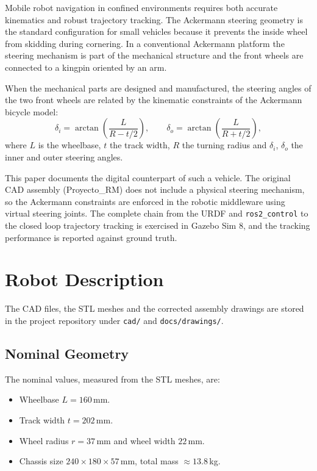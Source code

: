 \documentclass[conference]{IEEEtran}
\begin{document}
Mobile robot navigation in confined environments requires both accurate
kinematics and robust trajectory tracking. The Ackermann steering geometry is
the standard configuration for small vehicles because it prevents the inside
wheel from skidding during cornering. In a conventional Ackermann platform the
steering mechanism is part of the mechanical structure and the front wheels are
connected to a kingpin oriented by an arm.

When the mechanical parts are designed and manufactured, the steering angles of
the two front wheels are related by the kinematic constraints of the Ackermann
bicycle model:
\begin{equation}
  \delta_i = \arctan\left(\frac{L}{R - t/2}\right),
  \qquad
  \delta_o = \arctan\left(\frac{L}{R + t/2}\right),
  \label{eq:ackermann}
\end{equation}
where $L$ is the wheelbase, $t$ the track width, $R$ the turning radius and
$\delta_i$, $\delta_o$ the inner and outer steering angles.

This paper documents the digital counterpart of such a vehicle. The original
CAD assembly (Proyecto\_RM) does not include a physical steering mechanism, so
the Ackermann constraints are enforced in the robotic middleware using virtual
steering joints. The complete chain from the URDF and \texttt{ros2\_control} to
the closed loop trajectory tracking is exercised in Gazebo Sim 8, and the
tracking performance is reported against ground truth.

\section{Robot Description}
\label{sec:robot}

The CAD files, the STL meshes and the corrected assembly drawings are stored in
the project repository under \texttt{cad/} and \texttt{docs/drawings/}.

\subsection{Nominal Geometry}
\label{sec:geometry}

The nominal values, measured from the STL meshes, are:
\begin{itemize}
  \item Wheelbase $L = 160$\,mm.
  \item Track width $t = 202$\,mm.
  \item Wheel radius $r = 37$\,mm and wheel width $22$\,mm.
  \item Chassis size $240 \times 180 \times 57$\,mm, total mass $\approx 13.8$\,kg.
\end{itemize}
\end{document}
